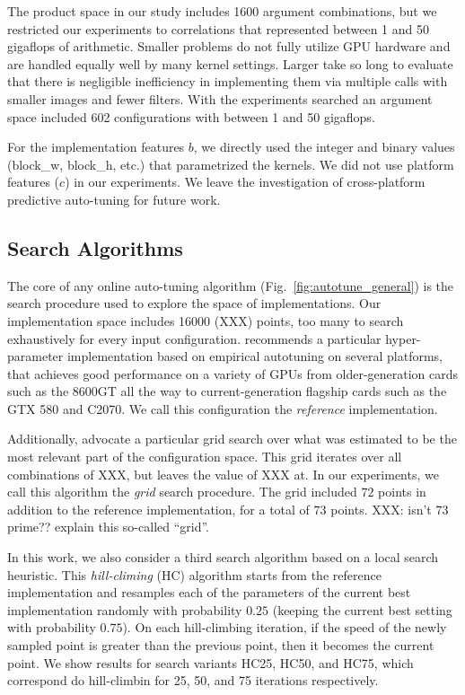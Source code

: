 \documentclass{sig-alternate}
\begin{document}

The product space in our study
includes 1600 argument combinations, but we restricted our experiments to correlations that
represented between 1 and 50 gigaflops of arithmetic.
Smaller problems do not fully utilize GPU hardware and are handled equally well by many kernel settings.
Larger take so long to evaluate that there is negligible
inefficiency in implementing them via multiple calls with smaller images and fewer filters.
With the experiments searched an argument space included 602 configurations with between 1 and 50 gigaflops.

For the implementation features $b$, we directly used the integer and binary values (block\_w, block\_h, etc.) that parametrized the kernels.
We did not use platform features ($c$) in our experiments. We leave the investigation
of cross-platform predictive auto-tuning for future work.

\subsection{Search Algorithms}

The core of any online auto-tuning algorithm (Fig.~\ref{fig:autotune_general}) is the search procedure used to explore the space of implementations.
Our implementation space includes 16000 (XXX) points, too many to search exhaustively for every input configuration.
\cite{cox+pinto:2011gcg} recommends a particular hyper-parameter implementation
based on empirical autotuning on several platforms, that achieves good
performance on a variety of GPUs from older-generation cards such as the
8600GT all the way to
current-generation flagship cards such as the GTX 580 and C2070.
We call this configuration the {\em reference} implementation.

Additionally, \cite{cox+pinto:2011gcg} advocate a particular grid search over
what was estimated to be the most relevant part of the configuration space. This grid iterates over all
combinations of XXX, but leaves the value of XXX at. In our experiments, we call this algorithm the {\em grid} search procedure.
The grid included $72$ points in addition to the reference implementation, for a total of $73$ points.
XXX: isn't 73 prime?? explain this so-called ``grid''.

In this work, we also consider a third search algorithm based on a local search
heuristic.  This {\em hill-climing} (HC) algorithm starts from the reference
implementation and resamples each of the parameters
of the current best implementation randomly with
probability $0.25$ (keeping the current best setting with probability $0.75$).
On each hill-climbing iteration, if the speed of the newly sampled point is greater than the previous point, then it becomes the current point.
We show results for search variants HC25, HC50, and HC75, which correspond do hill-climbin for 25, 50, and 75 iterations respectively.
\end{document}
